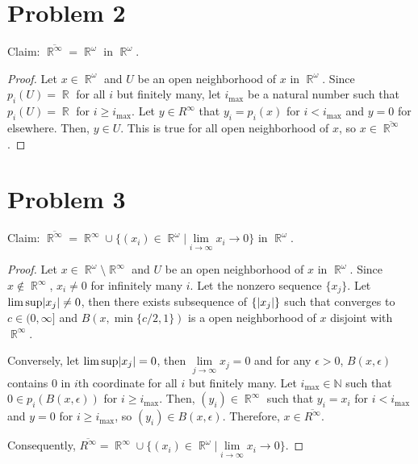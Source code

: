 \documentclass{article}
\DeclareMathOperator{\rr}{\mathbb{R}}
\DeclarePairedDelimiter\abs{\lvert}{\rvert}%
\begin{document}
\section*{Problem 2}
Claim: $\overline{\rr^\infty}=\rr^\omega$ in $\rr^\omega$.
\begin{proof}
Let $x\in \rr^\omega$ and $U$ be an open neighborhood of $x$ in $\rr^\omega$. Since $p_i(U)=\rr$ for all $i$ but finitely many, let 
$i_{\max}$ be a natural number such that $p_i(U)= \rr$ for $i\geq i_{\max}$. Let $y\in R^\infty$ that $y_i=p_i(x)$ for $i<i_{\max}$ and 
$y=0$ for elsewhere. Then, $y\in U$. This is true for all open neighborhood of $x$, so $x\in \overline{\rr^\infty}$.
\end{proof}
\section*{Problem 3}
Claim: $\overline{\rr^\infty}=\rr^\infty \cup \{(x_i)\in \rr^\omega|\lim\limits_{i\rightarrow \infty}x_i\rightarrow 0\}$ in $\rr^\omega$.
\begin{proof}
Let $x\in \rr^\omega\setminus \rr^\infty$ and $U$ be an open neighborhood of $x$ in $\rr^\omega$. Since $x\notin \rr^\infty$, $x_i\neq 0$ 
for infinitely many $i$. Let the nonzero sequence $\{x_j\}$. Let $\lim\sup \abs{x_j}\neq 0$, then there exists subsequence of $\{\abs{x_j}\}$
 such that converges to $c\in (0,\infty]$ and $B(x, \min\{c/2, 1\})$ is a open neighborhood of $x$ disjoint with $\rr^\infty$.

Conversely, let $\lim\sup \abs{x_j}= 0$, then $\lim\limits_{j\rightarrow \infty} x_j= 0$ and for any $\epsilon>0$, $B(x, \epsilon)$ contains $0$ in $i$th coordinate for all $i$ but finitely many. Let $i_{\max}\in \mathbb{N}$ such that $0\in p_i(B(x, \epsilon))$ for $i\geq i_{\max}$. Then, $(y_i)\in \rr^\infty$ such that $y_i=x_i$ for $i< i_{\max}$ and $y=0$ for $i\geq i_{\max}$, so $(y_i)\in B(x,\epsilon)$. Therefore, $x\in \overline{R^\infty}$.

Consequently, $\overline{R^\infty}=\rr^\infty \cup \{(x_i)\in \rr^\omega|\lim\limits_{i\rightarrow \infty}x_i\rightarrow 0\}$.
\end{proof}
\end{document}
